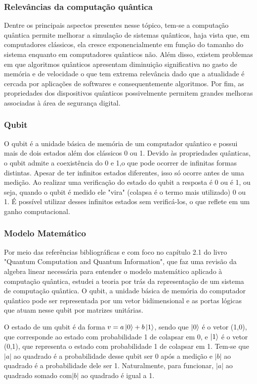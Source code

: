 \documentclass{article}
\begin{document}
        \subsubsection{Relevâncias da computação quântica}
        Dentre os principais aspectos presentes nesse tópico, tem-se a computação quântica permite melhorar a simulação de sistemas quânticos, haja vista que, em computadores clássicos, ela cresce exponencialmente em função do tamanho do sistema enquanto em computadores quânticos não. Além disso, existem problemas em que algoritmos quânticos apresentam diminuição significativa no gasto de memória e de velocidade o que tem extrema relevância dado que a atualidade é cercada por aplicações de softwares e consequentemente algoritmos. Por fim, as propriedades dos dispositivos quânticos possivelmente permitem grandes melhoras associadas à área de segurança digital. 

        \subsubsection{Qubit}
        O qubit é a unidade básica de memória de um computador quântico e possui mais de dois estados além dos clássicos 0 ou 1. Devido às propriedades quânticas, o qubit admite a coexistência do 0 e 1,o que pode ocorrer de infinitas formas distintas. Apesar de ter infinitos estados diferentes, isso só ocorre antes de uma medição. Ao realizar uma verificação do estado do qubit a resposta é 0 ou é 1, ou seja, quando o qubit é medido ele "vira" (colapsa é o termo mais utilizado) 0 ou 1. É possível utilizar desses infinitos estados sem verificá-los, o que reflete em um ganho computacional.
    
        \subsubsection{Modelo Matemático}
        Por meio das referências bibliográficas e com foco no capítulo 2.1 do livro "Quantum Computation and Quantum Information", que faz uma revisão da algebra linear necessária para entender o modelo matemático aplicado à computação quântica, estudei a teoria por trás da representação de um sistema de computação quântica. O qubit, a unidade básica de memória do computador quântico pode ser representada por um vetor bidimensional e as portas lógicas que atuam nesse qubit por matrizes unitárias. 

        O estado de um qubit é da forma $ v = a\ket{0} + b\ket{1}$, sendo que $\ket{0}$ é o vetor (1,0), que corresponde ao estado com probabilidade 1 de colapsar em 0, e $\ket{1}$ é o vetor (0,1), que representa o estado com probabilidade 1 de colapsar em 1. Tem-se que $|a|$ ao quadrado é a probabilidade desse qubit ser 0 após a medição e $|b|$ ao quadrado é a probabilidade dele ser 1. Naturalmente, para funcionar, $|a|$ ao quadrado somado com$|b|$ ao quadrado é igual a 1.
    
\end{document}
